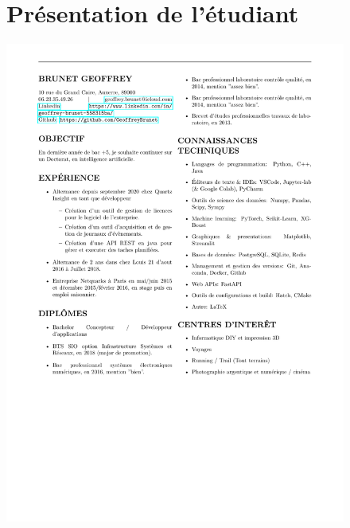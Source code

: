 \documentclass[a4paper, 11pt]{report}
\begin{document}
\begin{figure}
  \section{Présentation de l'étudiant}
  \includegraphics[scale=0.85, trim=2cm 0 0 0, clip]{CV-Geoffrey-Brunet.pdf}%
\end{figure}
\end{document}

